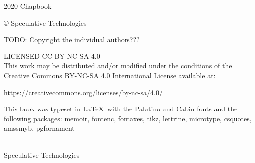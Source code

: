 



\pagestyle{empty}

\mainmatter
\raggedbottom

{
\null\vfill

\begin{flushleft}

{\small

{\variexfont{}2020 Chapbook}

© {\tubefont{}Speculative Technologies}

TODO: Copyright the individual authors???

\bigskip

LICENSED CC BY-NC-SA 4.0 \\
This work may be distributed and/or modified under the conditions of the Creative Commons BY-NC-SA 4.0 International License available at:
\begin{monotype}
https://creativecommons.org/licenses/by-nc-sa/4.0/
\end{monotype}

This book was typeset in \LaTeX\ with the Palatino and Cabin fonts and the following packages:
  memoir,
  fontenc,
  fontaxes,
  tikz,
  lettrine,
  microtype,
  csquotes,
  amssmyb,
  pgfornament
\bigskip
}
\end{flushleft}
}

\clearpage
\pagestyle{plain}

\begingroup%
\centering
\vspace*{24pt}
{\HUGE {}}\\[\baselineskip]
{\Huge \tubefont Speculative Technologies}\\[\baselineskip]
\vfill\null
\endgroup



{\setlength{\beforechapskip}{0pt}
\begin{KeepFromToc}
  \tableofcontents*
\end{KeepFromToc}
}


\clearpage

